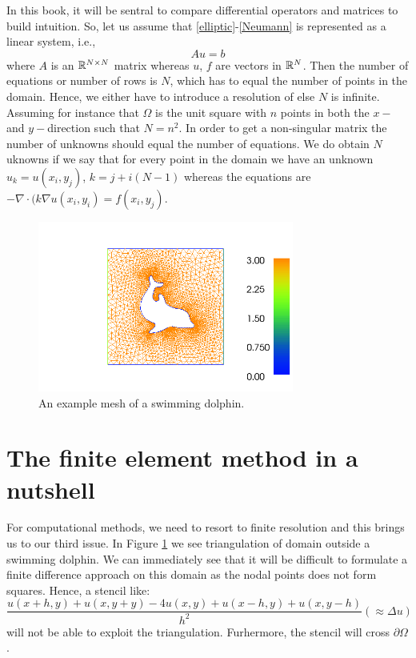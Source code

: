 In this book, it will be sentral to compare differential operators and matrices to build
intuition. So, let us assume that  
\eqref{elliptic}-\eqref{Neumann} is represented as a linear system, i.e.,  
\begin{equation}
\label{Aub}
A u = b 
\end{equation}
where $A$ is an $\mathbb{R}^{N\times N}$ matrix whereas $u$, $f$ are vectors in $\mathbb{R}^N$. 
Then the number of equations or number of rows is $N$, which has to equal the number
of points in the domain. Hence, we either have to introduce a resolution of else $N$ is 
infinite. Assuming for instance
that $\Omega$ is the unit square with $n$ points in both the $x-$ and $y-$direction such 
that $N=n^2$. In order to get a non-singular matrix the number of unknowns should
equal the number of equations. We do obtain $N$ uknowns if we say that for every
point in the domain we have an unknown $u_k = u(x_i, y_j)$, $k=j+i(N-1)$ whereas
the equations are     
$-\nabla\cdot (k \nabla  u(x_i, y_i) = f(x_i, y_j)$.    

\begin{figure}
\begin{center}
\includegraphics[width=0.75\textwidth]{chapters/elliptic/pics/dolfin_mesh.png}
\caption{An example mesh of a swimming dolphin.}
\label{fig:dolphin}
\end{center}
\end{figure}


\section{The finite element method in a nutshell}

For computational methods, we need to resort to finite resolution and this brings us to our third 
issue. In Figure \ref{fig:dolphin} we see triangulation of domain outside a swimming dolphin. We
can immediately see that it will be difficult to formulate a finite difference approach on this domain
as the nodal points does not form squares. Hence, a stencil like: 
\[
	\frac{u(x+h,y) + u(x,y+y) -4 u(x,y) + u(x-h,y) + u(x, y-h) }{h^2} (\approx \Delta u) 
\]
will not be able to exploit the triangulation. Furhermore, the stencil will cross $\partial \Omega$.   

